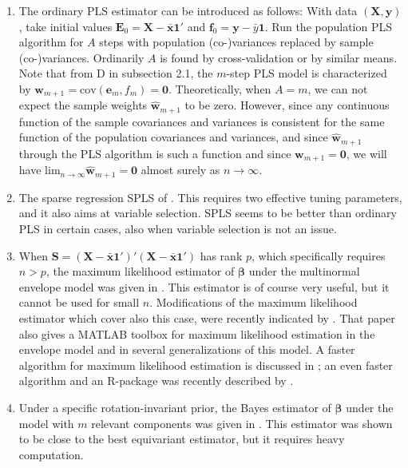 \documentclass[a4paper, 11pt]{article}
\begin{document}
\begin{enumerate}[label=\alph*.]

\item The ordinary PLS estimator can be introduced as follows: With data $(\bm{X},\bm{y})$, take initial values $\bm{E}_{0}=\bm{X}-\bar{\bm{x}}\bm{1}'$
  and $\bm{f}_{0}=\bm{y}-\bar{y}\bm{1}$. Run the population PLS algorithm for $A$ steps with population (co-)variances replaced by sample (co-)variances.
  Ordinarily $A$ is found by cross-validation or by similar means. Note that from D in subsection 2.1, the $m$-step PLS model is characterized by $\bm{w}_{m+1}=\mathrm{cov}(\bm{e}_m,f_m)=\bm{0}$. Theoretically, when $A=m$, we can not expect the sample weights $\widehat{\bm{w}}_{m+1}$
  to be zero. However, since any continuous function of the sample covariances and variances is consistent for the same function of the
  population covariances and variances, and since  $\widehat{\bm{w}}_{m+1}$ through the PLS algorithm is such a function and since $\bm{w}_{m+1}=\bm{0}$, we will have ${\mathrm{lim}_{n\rightarrow\infty}}\widehat{\bm{w}}_{m+1}=\bm{0}$ almost surely as $n\rightarrow\infty$.
  \smallskip

\item The sparse regression SPLS of \citet{chun2010sparse}. This requires two effective tuning parameters, and it also aims at variable selection. SPLS seems to be better than ordinary PLS in certain cases, also when variable selection is not an issue.
  \smallskip

\item When $\bm{S}=(\bm{X}-\bar{\bm{x}}\bm{1}')'(\bm{X}-\bar{\bm{x}}\bm{1}')$ has rank $p$, which specifically requires $n>p$, the maximum likelihood
  estimator of $\bm{\beta}$ under the multinormal envelope model was given in \citet{cook2013envelopes}. This estimator is of course very useful, but it cannot be used for small $n$. Modifications of the maximum likelihood estimator which cover also this case, were recently indicated by \citet{cook2015envlp}. That paper also gives a MATLAB toolbox for maximum likelihood estimation in the envelope model and in several generalizations of this model. A faster algorithm for maximum likelihood estimation is discussed in \citet{cook2016algorithms}; an even faster algorithm and an R-package was recently described by \citet{cook2016note}.
  \smallskip

\item Under a specific rotation-invariant prior, the Bayes estimator of $\bm{\beta}$ under the model with $m$ relevant components was given in \citet{helland2012near}. This estimator was shown to be close to the best equivariant estimator, but it requires heavy computation.
  \smallskip

\end{enumerate}
\end{document}
